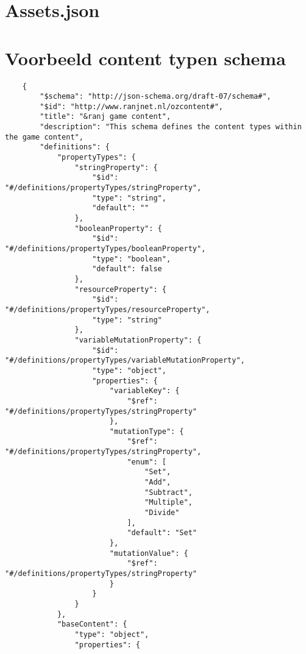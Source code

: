 \begin{appendices}
    \chapter{Assets.json}    
    \label{app:assetsjson}

    \chapter{Voorbeeld content typen schema}
    \lstset{language=JSON}
    \begin{lstlisting}
    {
        "$schema": "http://json-schema.org/draft-07/schema#",
        "$id": "http://www.ranjnet.nl/ozcontent#",
        "title": "&ranj game content",
        "description": "This schema defines the content types within the game content",
        "definitions": {
            "propertyTypes": {
                "stringProperty": {
                    "$id": "#/definitions/propertyTypes/stringProperty",
                    "type": "string",
                    "default": ""
                },
                "booleanProperty": {
                    "$id": "#/definitions/propertyTypes/booleanProperty",
                    "type": "boolean",
                    "default": false
                },
                "resourceProperty": {
                    "$id": "#/definitions/propertyTypes/resourceProperty",
                    "type": "string"
                },
                "variableMutationProperty": {
                    "$id": "#/definitions/propertyTypes/variableMutationProperty",
                    "type": "object",
                    "properties": {
                        "variableKey": {
                            "$ref": "#/definitions/propertyTypes/stringProperty"
                        },
                        "mutationType": {
                            "$ref": "#/definitions/propertyTypes/stringProperty",
                            "enum": [
                                "Set",
                                "Add",
                                "Subtract",
                                "Multiple",
                                "Divide"
                            ],
                            "default": "Set"
                        },
                        "mutationValue": {
                            "$ref": "#/definitions/propertyTypes/stringProperty"
                        }
                    }
                }
            },
            "baseContent": {
                "type": "object",
                "properties": {

\end{lstlisting}
\end{appendices}
